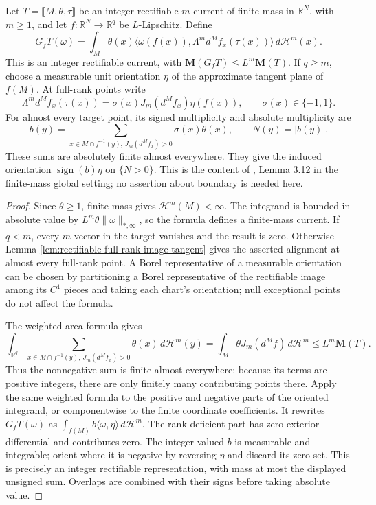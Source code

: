 \begin{theorem}\label{thm:integer-rectifiable-geometric-image}
Let $T=\llbracket M,\theta,\tau\rrbracket$ be an integer rectifiable $m$-current of finite mass in $\mathbb R^N$, with $m\geq1$, and let $f:\mathbb R^N\to\mathbb R^q$ be $L$-Lipschitz. Define
\[
 G_fT(\omega)=\int_M\theta(x)
 \bigl\langle\omega(f(x)),\Lambda^m d^Mf_x(\tau(x))\bigr\rangle
 \,d\mathcal H^m(x).
\]
This is an integer rectifiable current, with $\mathbf M(G_fT)\leq L^m\mathbf M(T)$. If $q\geq m$, choose a measurable unit orientation $\eta$ of the approximate tangent plane of $f(M)$. At full-rank points write
\[
 \Lambda^m d^Mf_x(\tau(x))
 =\sigma(x)J_m(d^Mf_x)\eta(f(x)),\qquad \sigma(x)\in\{-1,1\}.
\]
For almost every target point, its signed multiplicity and absolute multiplicity are
\[
 b(y)=\sum_{x\in M\cap f^{-1}(y),\,J_m(d^Mf_x)>0}
           \sigma(x)\theta(x),
 \qquad N(y)=|b(y)|.
\]
These sums are absolutely finite almost everywhere. They give the induced orientation $\operatorname{sign}(b)\eta$ on $\{N>0\}$. This is the content of \cite{Sim18}, Lemma 3.12 in the finite-mass global setting; no assertion about boundary is needed here.
\end{theorem}
\begin{proof}
Since $\theta\geq1$, finite mass gives $\mathcal H^m(M)<\infty$. The integrand is bounded in absolute value by $L^m\theta\|\omega\|_{*,\infty}$, so the formula defines a finite-mass current. If $q<m$, every $m$-vector in the target vanishes and the result is zero. Otherwise Lemma \ref{lem:rectifiable-full-rank-image-tangent} gives the asserted alignment at almost every full-rank point. A Borel representative of a measurable orientation can be chosen by partitioning a Borel representative of the rectifiable image among its $C^1$ pieces and taking each chart's orientation; null exceptional points do not affect the formula.

The weighted area formula gives
\[
 \int_{\mathbb R^q}\sum_{x\in M\cap f^{-1}(y),\,J_m(d^Mf_x)>0}
                 \theta(x)\,d\mathcal H^m(y)
 =\int_M\theta J_m(d^Mf)\,d\mathcal H^m
 \leq L^m\mathbf M(T).
\]
Thus the nonnegative sum is finite almost everywhere; because its terms are positive integers, there are only finitely many contributing points there. Apply the same weighted formula to the positive and negative parts of the oriented integrand, or componentwise to the finite coordinate coefficients. It rewrites $G_fT(\omega)$ as $\int_{f(M)}b\langle\omega,\eta\rangle\,d\mathcal H^m$. The rank-deficient part has zero exterior differential and contributes zero. The integer-valued $b$ is measurable and integrable; orient where it is negative by reversing $\eta$ and discard its zero set. This is precisely an integer rectifiable representation, with mass at most the displayed unsigned sum. Overlaps are combined with their signs before taking absolute value.
\end{proof}

